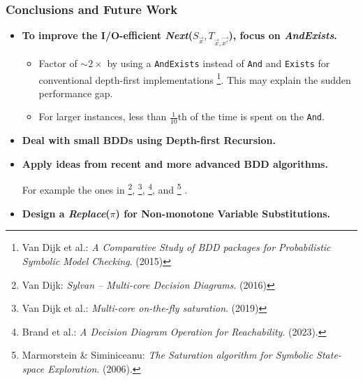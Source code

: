 \documentclass[english, aspectratio=169]{beamer}
\begin{document}
\begin{frame}
  \frametitle{Conclusions and Future Work}

  \begin{itemize}
  \item<1-> {\bf To improve the I/O-efficient \emph{Next}($S_{\vec{x}}, T_{\vec{x}, \vec{x'}}$), focus
      on \emph{AndExists}.}

    \begin{itemize}
      \small

    \item Factor of $\sim 2\times$ by using a \texttt{AndExists} instead of \texttt{And} and
      \texttt{Exists} for conventional depth-first implementations \footnote{\tiny\quad Van Dijk et
        al.: \emph{A Comparative Study of BDD packages for Probabilistic Symbolic Model Checking}.
        (2015)}. This may explain the sudden performance gap.

    \item For larger instances, less than $\tfrac{1}{10}$th of the time is spent on the \texttt{And}.
    \end{itemize}

  \item<2-> {\bf Deal with small BDDs using Depth-first Recursion.}

  \item<3-> {\bf Apply ideas from recent and more advanced BDD algorithms.}

    {\small

      For example the ones in \footnote{\tiny\quad Van Dijk: \emph{Sylvan – Multi-core Decision
          Diagrams}. (2016)}, %
      \footnote{\tiny\quad Van Dijk et al.: \emph{Multi-core on-the-fly saturation}. (2019)}, %
      \footnote{\tiny\quad Brand et al.: \emph{A Decision Diagram Operation for Reachability}.
        (2023).}, and %
      \footnote{\tiny\quad Marmorstein \& Siminiceanu: \emph{The Saturation algorithm for Symbolic
          State-space Exploration}. (2006).} .}

    \bigskip

  \item<4-> {\bf Design a \emph{Replace}($\pi$) for Non-monotone Variable Substitutions.}
  \end{itemize}

  \bigskip
\end{frame}



\begin{frame}
  \begin{figure}
    \centering

    \begin{tikzpicture}
      
    \end{tikzpicture}
  \end{figure}
\end{frame}
\end{document}
